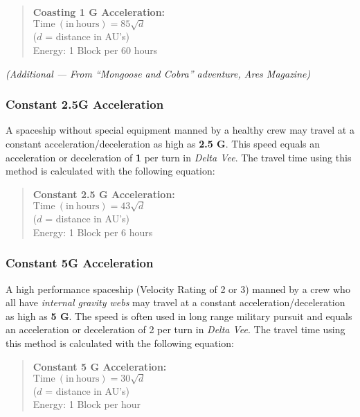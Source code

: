 \begin{quote}
  \textbf{Coasting 1 G Acceleration:}\\
  $\mathrm{Time~(in~hours)} = 85\sqrt{d}$\\
  ($d$ = distance in AU's)\\
  Energy: 1 Block per 60 hours
\end{quote} 

\emph{(Additional --- From ``Mongoose and Cobra'' adventure,
  \emph{Ares Magazine})}


\subsubsection*{Constant 2.5G Acceleration}
\label{sec:const-2.5g-accel}


A spaceship without special equipment manned by a healthy crew may
travel at a constant acceleration/deceleration as high as \textbf{2.5
  G}.  This speed equals an acceleration or deceleration of \textbf{1} per turn
in \emph{Delta Vee}.  The travel time using this method is calculated
with the following equation:

\begin{quote}
  \textbf{Constant 2.5 G Acceleration:}\\
  $\mathrm{Time~(in~hours)} = 43\sqrt{d}$\\
  ($d$ = distance in AU's)\\
  Energy: 1 Block per 6 hours
\end{quote} 


\subsubsection*{Constant 5G Acceleration}
\label{sec:const-5g-accel}



A high performance spaceship (Velocity Rating of 2 or 3) manned by a
crew who all have \emph{internal gravity webs} may travel at a
constant acceleration/deceleration as high as \textbf{5 G}. The speed
is often used in long range military pursuit and equals an
acceleration or deceleration of 2 per turn in \emph{Delta Vee}. The
travel time using this method is calculated with the following
equation:

\begin{quote}
  \textbf{Constant 5 G Acceleration:}\\
  $\mathrm{Time~(in~hours)} = 30\sqrt{d}$\\
  ($d$ = distance in AU's)\\
  Energy: 1 Block per hour
\end{quote} 


